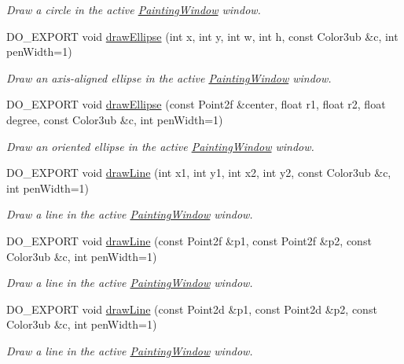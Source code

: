 \begin{DoxyCompactItemize}
\begin{DoxyCompactList}\small\item\em Draw a circle in the active \hyperlink{class_d_o_1_1_painting_window}{Painting\-Window} window. \end{DoxyCompactList}\item 
D\-O\-\_\-\-E\-X\-P\-O\-R\-T void \hyperlink{group___draw2_d_ga7f9dee248b78883c0948e13612831835}{draw\-Ellipse} (int x, int y, int w, int h, const Color3ub \&c, int pen\-Width=1)
\begin{DoxyCompactList}\small\item\em Draw an axis-\/aligned ellipse in the active \hyperlink{class_d_o_1_1_painting_window}{Painting\-Window} window. \end{DoxyCompactList}\item 
D\-O\-\_\-\-E\-X\-P\-O\-R\-T void \hyperlink{group___draw2_d_gad48ba1e8253e2f9308cc1b6c4c3eec22}{draw\-Ellipse} (const Point2f \&center, float r1, float r2, float degree, const Color3ub \&c, int pen\-Width=1)
\begin{DoxyCompactList}\small\item\em Draw an oriented ellipse in the active \hyperlink{class_d_o_1_1_painting_window}{Painting\-Window} window. \end{DoxyCompactList}\item 
D\-O\-\_\-\-E\-X\-P\-O\-R\-T void \hyperlink{group___draw2_d_ga768901f98aa242de772e32e0aaad4bd1}{draw\-Line} (int x1, int y1, int x2, int y2, const Color3ub \&c, int pen\-Width=1)
\begin{DoxyCompactList}\small\item\em Draw a line in the active \hyperlink{class_d_o_1_1_painting_window}{Painting\-Window} window. \end{DoxyCompactList}\item 
D\-O\-\_\-\-E\-X\-P\-O\-R\-T void \hyperlink{group___draw2_d_gab6fedda279868c00c6e6b905cfabf6ba}{draw\-Line} (const Point2f \&p1, const Point2f \&p2, const Color3ub \&c, int pen\-Width=1)
\begin{DoxyCompactList}\small\item\em Draw a line in the active \hyperlink{class_d_o_1_1_painting_window}{Painting\-Window} window. \end{DoxyCompactList}\item 
D\-O\-\_\-\-E\-X\-P\-O\-R\-T void \hyperlink{group___draw2_d_ga89406d15592ca2c54fa17468c6ce7fa3}{draw\-Line} (const Point2d \&p1, const Point2d \&p2, const Color3ub \&c, int pen\-Width=1)
\begin{DoxyCompactList}\small\item\em Draw a line in the active \hyperlink{class_d_o_1_1_painting_window}{Painting\-Window} window. \end{DoxyCompactList}\item 

\end{DoxyCompactItemize}
